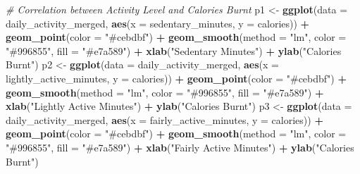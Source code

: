 \documentclass[
]{article}
\newenvironment{Shaded}{\begin{snugshade}}{\end{snugshade}}
\newcommand{\AttributeTok}[1]{\textcolor[rgb]{0.13,0.29,0.53}{#1}}
\newcommand{\CommentTok}[1]{\textcolor[rgb]{0.56,0.35,0.01}{\textit{#1}}}
\newcommand{\FunctionTok}[1]{\textcolor[rgb]{0.13,0.29,0.53}{\textbf{#1}}}
\newcommand{\NormalTok}[1]{#1}
\newcommand{\OtherTok}[1]{\textcolor[rgb]{0.56,0.35,0.01}{#1}}
\newcommand{\SpecialCharTok}[1]{\textcolor[rgb]{0.81,0.36,0.00}{\textbf{#1}}}
\newcommand{\StringTok}[1]{\textcolor[rgb]{0.31,0.60,0.02}{#1}}
\begin{document}
\begin{Shaded}
\begin{Highlighting}[]
\CommentTok{\# Correlation between Activity Level and Calories Burnt}
\NormalTok{p1 }\OtherTok{\textless{}{-}} \FunctionTok{ggplot}\NormalTok{(}\AttributeTok{data =}\NormalTok{ daily\_activity\_merged, }\FunctionTok{aes}\NormalTok{(}\AttributeTok{x =}\NormalTok{ sedentary\_minutes, }\AttributeTok{y =}\NormalTok{ calories)) }\SpecialCharTok{+} \FunctionTok{geom\_point}\NormalTok{(}\AttributeTok{color =} \StringTok{"\#cebdbf"}\NormalTok{) }\SpecialCharTok{+} \FunctionTok{geom\_smooth}\NormalTok{(}\AttributeTok{method =} \StringTok{"lm"}\NormalTok{, }\AttributeTok{color =} \StringTok{"\#996855"}\NormalTok{, }\AttributeTok{fill =} \StringTok{"\#e7a589"}\NormalTok{) }\SpecialCharTok{+} \FunctionTok{xlab}\NormalTok{(}\StringTok{"Sedentary Minutes"}\NormalTok{) }\SpecialCharTok{+} \FunctionTok{ylab}\NormalTok{(}\StringTok{"Calories Burnt"}\NormalTok{)}
\NormalTok{p2 }\OtherTok{\textless{}{-}} \FunctionTok{ggplot}\NormalTok{(}\AttributeTok{data =}\NormalTok{ daily\_activity\_merged, }\FunctionTok{aes}\NormalTok{(}\AttributeTok{x =}\NormalTok{ lightly\_active\_minutes, }\AttributeTok{y =}\NormalTok{ calories)) }\SpecialCharTok{+} \FunctionTok{geom\_point}\NormalTok{(}\AttributeTok{color =} \StringTok{"\#cebdbf"}\NormalTok{) }\SpecialCharTok{+} \FunctionTok{geom\_smooth}\NormalTok{(}\AttributeTok{method =} \StringTok{"lm"}\NormalTok{, }\AttributeTok{color =} \StringTok{"\#996855"}\NormalTok{, }\AttributeTok{fill =} \StringTok{"\#e7a589"}\NormalTok{) }\SpecialCharTok{+} \FunctionTok{xlab}\NormalTok{(}\StringTok{"Lightly Active Minutes"}\NormalTok{) }\SpecialCharTok{+} \FunctionTok{ylab}\NormalTok{(}\StringTok{"Calories Burnt"}\NormalTok{)}
\NormalTok{p3 }\OtherTok{\textless{}{-}} \FunctionTok{ggplot}\NormalTok{(}\AttributeTok{data =}\NormalTok{ daily\_activity\_merged, }\FunctionTok{aes}\NormalTok{(}\AttributeTok{x =}\NormalTok{ fairly\_active\_minutes, }\AttributeTok{y =}\NormalTok{ calories)) }\SpecialCharTok{+} \FunctionTok{geom\_point}\NormalTok{(}\AttributeTok{color =} \StringTok{"\#cebdbf"}\NormalTok{) }\SpecialCharTok{+} \FunctionTok{geom\_smooth}\NormalTok{(}\AttributeTok{method =} \StringTok{"lm"}\NormalTok{, }\AttributeTok{color =} \StringTok{"\#996855"}\NormalTok{, }\AttributeTok{fill =} \StringTok{"\#e7a589"}\NormalTok{) }\SpecialCharTok{+} \FunctionTok{xlab}\NormalTok{(}\StringTok{"Fairly Active Minutes"}\NormalTok{) }\SpecialCharTok{+} \FunctionTok{ylab}\NormalTok{(}\StringTok{"Calories Burnt"}\NormalTok{)}

\end{Highlighting}
\end{Shaded}
\end{document}
